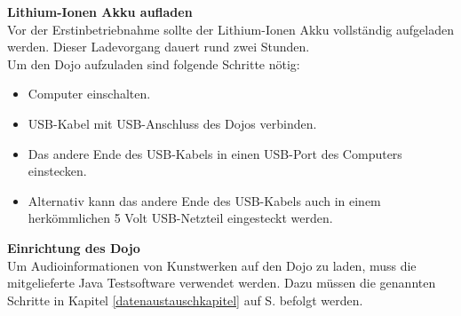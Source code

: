 \textbf{Lithium-Ionen Akku aufladen}
\\[4mm]
Vor der Erstinbetriebnahme sollte der Lithium-Ionen Akku vollständig aufgeladen werden. Dieser Ladevorgang dauert rund zwei Stunden.
\\[4mm]
Um den Dojo aufzuladen sind folgende Schritte nötig:
\begin{itemize}
\item Computer einschalten.
\end{itemize}
\begin{itemize}
\item USB-Kabel mit USB-Anschluss des Dojos verbinden.
\end{itemize}
\begin{itemize}
\item Das andere Ende des USB-Kabels in einen USB-Port des Computers einstecken.
\end{itemize}
\begin{itemize}
\item Alternativ kann das andere Ende des USB-Kabels auch in einem herkömmlichen 5 Volt USB-Netzteil eingesteckt werden.
\end{itemize}
\textbf{Einrichtung des Dojo}
\\[4mm]
Um Audioinformationen von Kunstwerken auf den Dojo zu laden, muss die mitgelieferte Java Testsoftware verwendet werden. Dazu müssen die genannten Schritte in Kapitel \ref{datenaustauschkapitel} auf S.\pageref{datenaustauschkapitel} befolgt werden.